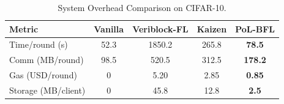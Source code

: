 
\begin{table}[t]
\centering
\caption{System Overhead Comparison on CIFAR-10.}
\label{tab:overhead}
\small
\begin{tabular}{l|cccc}
\toprule
\textbf{Metric} & \textbf{Vanilla} & \textbf{Veriblock-FL} & \textbf{Kaizen} & \textbf{PoL-BFL} \\
\midrule
Time/round (s) & 52.3 & 1850.2 & 265.8 & \textbf{78.5} \\
Comm (MB/round) & 98.5 & 520.5 & 312.5 & \textbf{178.2} \\
Gas (USD/round) & 0 & 5.20 & 2.85 & \textbf{0.85} \\
Storage (MB/client) & 0 & 45.8 & 12.8 & \textbf{2.5} \\
\bottomrule
\end{tabular}
\end{table}
